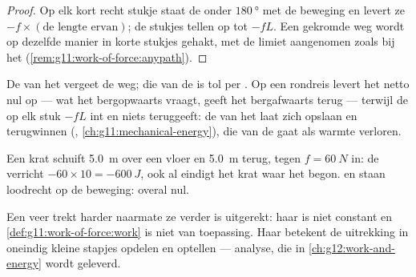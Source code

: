 \begin{proof}
Op elk kort recht stukje staat de  onder $\qty{180}{\degree}$ met
de beweging en levert ze $-f \times (\text{de lengte ervan})$; de stukjes
tellen op tot $-fL$. Een gekromde weg wordt op dezelfde manier in korte
stukjes gehakt, met de limiet aangenomen zoals bij het 
(\cref{rem:g11:work-of-force:anypath}).
\end{proof}

\begin{remark}\label{rem:g11:work-of-force:divide}
De  van het  vergeet de weg; die van de  is tol per
. Op een rondreis levert het  netto nul op --- wat het
bergopwaarts vraagt, geeft het bergafwaarts terug --- terwijl de 
op elk stuk $-fL$ int en niets teruggeeft: de  van het 
laat zich opslaan en terugwinnen (,
\cref{ch:g11:mechanical-energy}), die van de  gaat als warmte
verloren.
\end{remark}

\begin{example}\label{ex:g11:work-of-force:roundtrip}
Een krat schuift \qty{5.0}{m} over een vloer en \qty{5.0}{m} terug, tegen
$f = \qty{60}{N}$ in: de  verricht
$-60 \times 10 = \qty{-600}{J}$, ook al eindigt het krat waar het
begon.  en  staan loodrecht op de beweging: overal
nul.
\end{example}

\begin{remark}\label{rem:g11:work-of-force:spring}
Een veer trekt harder naarmate ze verder is uitgerekt: haar  is
niet constant en \cref{def:g11:work-of-force:work} is niet van
toepassing. Haar  betekent de uitrekking in oneindig kleine stapjes
opdelen en optellen --- analyse, die in \cref{ch:g12:work-and-energy}
wordt geleverd.
\end{remark}

